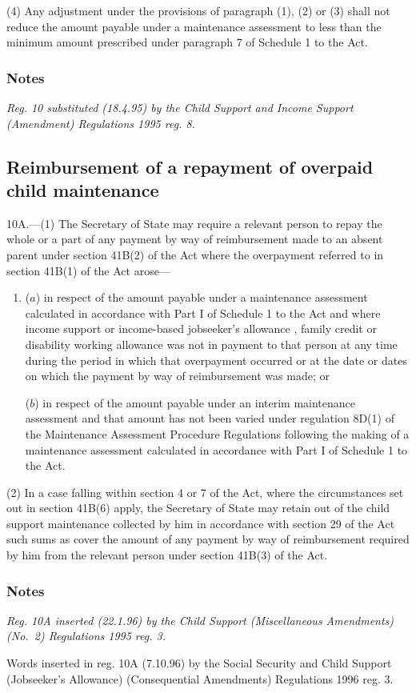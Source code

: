 \documentclass[a4paper]{article}
\newcommand\amendment[1]{\subsubsection*{Notes}{\itshape\frenchspacing\footnotesize #1 \par}}
\begin{document}
(4) Any adjustment under the provisions of paragraph (1), (2) or (3) shall not reduce the amount payable under a maintenance assessment to less than the minimum amount prescribed under paragraph 7 of Schedule 1 to the Act.

\amendment{
Reg. 10 substituted (18.4.95) by the Child Support and Income Support (Amendment) Regulations 1995 reg. 8.
}


\subsection[10A. Reimbursement of a repayment of overpaid child maintenance]{Reimbursement of a repayment of overpaid child maintenance}

10A.—(1) The Secretary of State may require a relevant person to repay the whole or a part of any payment by way of reimbursement made to an absent parent under section 41B(2) of the Act where the overpayment referred to in section 41B(1) of the Act arose—
\begin{enumerate}\item[]
($a$) in respect of the amount payable under a maintenance assessment calculated in accordance with Part I of Schedule 1 to the Act and where income support
or income-based jobseeker’s allowance%
, family credit or disability working allowance was not in payment to that person at any time during the period in which that overpayment occurred or at the date or dates on which the payment by way of reimbursement was made; or

($b$) in respect of the amount payable under an interim maintenance assessment and that amount has not been varied under regulation 8D(1) of the Maintenance Assessment Procedure Regulations following the making of a maintenance assessment calculated in accordance with Part I of Schedule 1 to the Act.
\end{enumerate}

(2) In a case falling within section 4 or 7 of the Act, where the circumstances set out in section 41B(6) apply, the Secretary of State may retain out of the child support maintenance collected by him in accordance with section 29 of the Act such sums as cover the amount of any payment by way of reimbursement required by him from the relevant person under section 41B(3) of the Act.

\amendment{
Reg. 10A inserted (22.1.96) by the Child Support (Miscellaneous Amendments) (No.\ 2) Regulations 1995 reg. 3.

Words inserted in reg. 10A (7.10.96) by the Social Security and Child Support (Jobseeker's Allowance) (Consequential Amendments) Regulations 1996 reg. 3.
}
\end{document}
